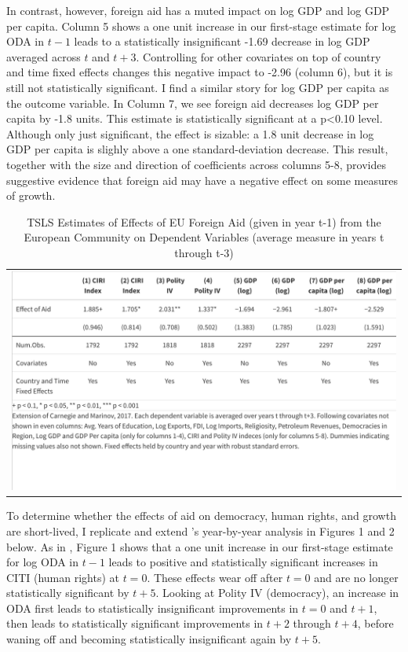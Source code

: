 \documentclass[12pt, ]{article}
\begin{document}
In contrast, however, foreign aid has a muted impact on log GDP and log
GDP per capita. Column 5 shows a one unit increase in our first-stage
estimate for log ODA in \(t-1\) leads to a statistically insignificant
-1.69 decrease in log GDP averaged across \(t\) and \(t+3\). Controlling
for other covariates on top of country and time fixed effects changes
this negative impact to -2.96 (column 6), but it is still not
statistically significant. I find a similar story for log GDP per capita
as the outcome variable. In Column 7, we see foreign aid decreases log
GDP per capita by -1.8 units. This estimate is statistically significant
at a p\textless0.10 level. Although only just significant, the effect is
sizable: a 1.8 unit decrease in log GDP per capita is slighly above a
one standard-deviation decrease. This result, together with the size and
direction of coefficients across columns 5-8, provides suggestive
evidence that foreign aid may have a negative effect on some measures of
growth.

\hypertarget{tbl-two}{}
\begin{longtable}[]{@{}l@{}}
\caption{\label{tbl-two}TSLS Estimates of Effects of EU Foreign Aid
(given in year t-1) from the European Community on Dependent Variables
(average measure in years t through t-3)}\tabularnewline
\toprule\noalign{}
\endfirsthead
\endhead
\bottomrule\noalign{}
\endlastfoot
\includegraphics{figures/Table 2.jpeg} \\
\end{longtable}

To determine whether the effects of aid on democracy, human rights, and
growth are short-lived, I replicate and extend
\citet{carnegie2017foreign}'s year-by-year analysis in Figures 1 and 2
below. As in \citet{carnegie2017foreign}, Figure 1 shows that a one unit
increase in our first-stage estimate for log ODA in \(t-1\) leads to
positive and statistically significant increases in CITI (human rights)
at \(t=0\). These effects wear off after \(t=0\) and are no longer
statistically significant by \(t+5\). Looking at Polity IV (democracy),
an increase in ODA first leads to statistically insignificant
improvements in \(t=0\) and \(t+1\), then leads to statistically
significant improvements in \(t + 2\) through \(t+4\), before waning off
and becoming statistically insignificant again by \(t+5\).
\end{document}
